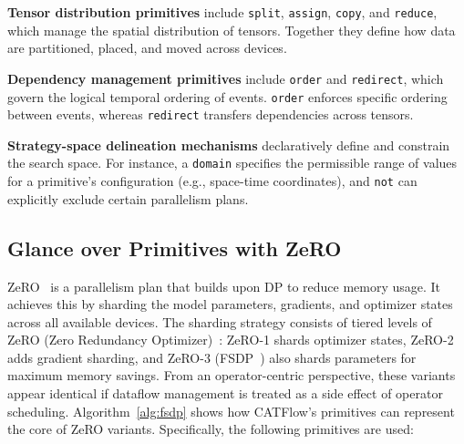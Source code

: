 \documentclass[letterpaper,twocolumn,10pt]{article}
\newcommand{\name}{CATFlow}
\begin{document}
\textbf{Tensor distribution primitives} include \texttt{split}, \texttt{assign}, \texttt{copy}, and \texttt{reduce}, which manage the spatial distribution of tensors. Together they define how data are partitioned, placed, and moved across devices.

\textbf{Dependency management primitives} include \texttt{order} and \texttt{redirect}, which govern the logical temporal ordering of events. \texttt{order} enforces specific ordering between events, whereas \texttt{redirect} transfers dependencies across tensors.

\textbf{Strategy-space delineation mechanisms} declaratively define and constrain the search space. For instance, a \texttt{domain} specifies the permissible range of values for a primitive's configuration (e.g., space-time coordinates), and \texttt{not} can explicitly exclude certain parallelism plans.

\subsection{Glance over Primitives with ZeRO}
\label{sec:primitives_glance}

ZeRO~\cite{rajbhandari2020zero, zhao2023pytorch} is a parallelism plan that builds upon DP to reduce memory usage. It achieves this by sharding the model parameters, gradients, and optimizer states across all available devices. The sharding strategy consists of tiered levels of ZeRO (Zero Redundancy Optimizer)~\cite{rajbhandari2020zero}: ZeRO-1 shards optimizer states, ZeRO-2 adds gradient sharding, and ZeRO-3 (FSDP~\cite{zhao2023pytorch}) also shards parameters for maximum memory savings. From an operator-centric perspective, these variants appear identical if dataflow management is treated as a side effect of operator scheduling. Algorithm~\ref{alg:fsdp} shows how \name{}'s primitives can represent the core of ZeRO variants. Specifically, the following primitives are used:


\end{document}
